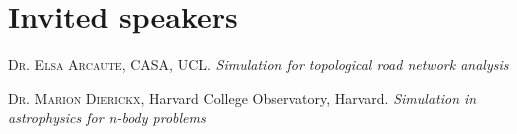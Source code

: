 \documentclass[11pt]{article}
\newcommand{\noun}[1]{\textsc{#1}}
\begin{document}









\section*{Invited speakers}

\noindent\noun{Dr. Elsa Arcaute}, CASA, UCL. \textit{Simulation for topological road network analysis}

\noindent\noun{Dr. Marion Dierickx}, Harvard College Observatory, Harvard. \textit{Simulation in astrophysics for n-body problems}
\end{document}
